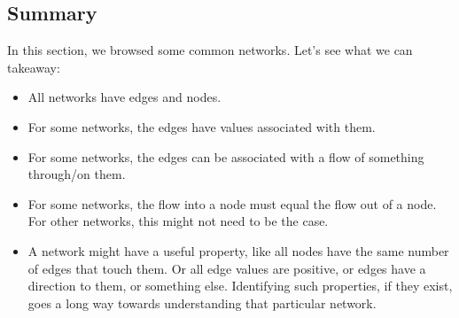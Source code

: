 \subsection{Summary}
In this section, we browsed some common networks. Let's see what we can takeaway:
\begin{itemize}
\item All networks have edges and nodes.
\item For some networks, the edges have values associated with them.
\item For some networks, the edges can be associated with a flow of something through/on them.
\item For some networks, the flow into a node must equal the flow out of a node. For other networks, this might not need to be the case.
\item A network might have a useful property, like all nodes have the same number of edges that touch them. Or all edge values are positive, or edges have a direction to them, or something else. Identifying such properties, if they exist, goes a long way towards understanding that particular network.
\end{itemize}



